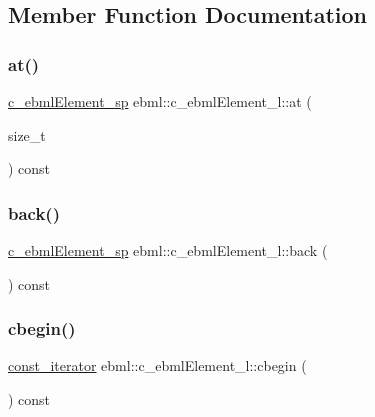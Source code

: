 \subsection{Member Function Documentation}
\mbox{\label{classebml_1_1c__ebmlElement__l_a81866f8123d15fb41d7f8e8d4e4cca41}} 
\subsubsection{\texorpdfstring{at()}{at()}}
{\footnotesize\ttfamily \mbox{\hyperlink{namespaceebml_a2deef4e8071531b32e3533f1bf978917}{c\+\_\+ebml\+Element\+\_\+sp}} ebml\+::c\+\_\+ebml\+Element\+\_\+l\+::at (\begin{DoxyParamCaption}\item[{size\+\_\+t}]{ }\end{DoxyParamCaption}) const}

\mbox{\label{classebml_1_1c__ebmlElement__l_a9a3f7be3e7bb6d6c3005da1c3140247e}} 
\subsubsection{\texorpdfstring{back()}{back()}}
{\footnotesize\ttfamily \mbox{\hyperlink{namespaceebml_a2deef4e8071531b32e3533f1bf978917}{c\+\_\+ebml\+Element\+\_\+sp}} ebml\+::c\+\_\+ebml\+Element\+\_\+l\+::back (\begin{DoxyParamCaption}{ }\end{DoxyParamCaption}) const}

\mbox{\label{classebml_1_1c__ebmlElement__l_ae6f0e1b17374fbaee1ffdac656a46496}} 
\subsubsection{\texorpdfstring{cbegin()}{cbegin()}}
{\footnotesize\ttfamily \mbox{\hyperlink{classebml_1_1c__ebmlElement__l_1_1const__iterator}{const\+\_\+iterator}} ebml\+::c\+\_\+ebml\+Element\+\_\+l\+::cbegin (\begin{DoxyParamCaption}{ }\end{DoxyParamCaption}) const}


